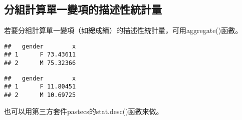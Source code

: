 \documentclass[
]{book}
\newenvironment{Shaded}{\begin{snugshade}}{\end{snugshade}}
\newcommand{\AttributeTok}[1]{\textcolor[rgb]{0.77,0.63,0.00}{#1}}
\newcommand{\ConstantTok}[1]{\textcolor[rgb]{0.00,0.00,0.00}{#1}}
\newcommand{\FunctionTok}[1]{\textcolor[rgb]{0.00,0.00,0.00}{#1}}
\newcommand{\NormalTok}[1]{#1}
\newcommand{\SpecialCharTok}[1]{\textcolor[rgb]{0.00,0.00,0.00}{#1}}
\begin{document}
\hypertarget{ux5206ux7d44ux8a08ux7b97ux55aeux4e00ux8b8aux9805ux7684ux63cfux8ff0ux6027ux7d71ux8a08ux91cf}{%
\subsection{分組計算單一變項的描述性統計量}\label{ux5206ux7d44ux8a08ux7b97ux55aeux4e00ux8b8aux9805ux7684ux63cfux8ff0ux6027ux7d71ux8a08ux91cf}}

若要分組計算單一變項（如總成績）的描述性統計量，可用aggregate()函數。

\begin{Shaded}
\end{Shaded}

\begin{verbatim}
##   gender        x
## 1      F 73.43611
## 2      M 75.32366
\end{verbatim}

\begin{Shaded}
\end{Shaded}

\begin{verbatim}
##   gender        x
## 1      F 11.80451
## 2      M 10.69725
\end{verbatim}

也可以用第三方套件pastecs的stat.desc()函數來做。

\begin{Shaded}
\end{Shaded}
\end{document}
